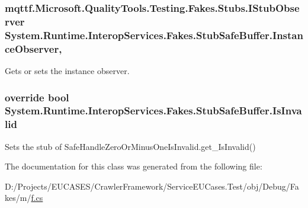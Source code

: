 \hypertarget{class_system_1_1_runtime_1_1_interop_services_1_1_fakes_1_1_stub_safe_buffer_a2b32c16b3bcfc3c0ff530913b7f87ce3}{
\subsubsection[{Instance\-Observer}]{\setlength{\rightskip}{0pt plus 5cm}mqttf.\-Microsoft.\-Quality\-Tools.\-Testing.\-Fakes.\-Stubs.\-I\-Stub\-Observer System.\-Runtime.\-Interop\-Services.\-Fakes.\-Stub\-Safe\-Buffer.\-Instance\-Observer\hspace{0.3cm}{\ttfamily [get]}, {\ttfamily [set]}}}\label{class_system_1_1_runtime_1_1_interop_services_1_1_fakes_1_1_stub_safe_buffer_a2b32c16b3bcfc3c0ff530913b7f87ce3}


Gets or sets the instance observer.

\hypertarget{class_system_1_1_runtime_1_1_interop_services_1_1_fakes_1_1_stub_safe_buffer_a4d719a99a6517b9b7baef7d8c5ab93b7}{
\subsubsection[{Is\-Invalid}]{\setlength{\rightskip}{0pt plus 5cm}override bool System.\-Runtime.\-Interop\-Services.\-Fakes.\-Stub\-Safe\-Buffer.\-Is\-Invalid\hspace{0.3cm}{\ttfamily [get]}}}\label{class_system_1_1_runtime_1_1_interop_services_1_1_fakes_1_1_stub_safe_buffer_a4d719a99a6517b9b7baef7d8c5ab93b7}


Sets the stub of Safe\-Handle\-Zero\-Or\-Minus\-One\-Is\-Invalid.\-get\-\_\-\-Is\-Invalid()



The documentation for this class was generated from the following file\-:\begin{DoxyCompactItemize}
\item 
D\-:/\-Projects/\-E\-U\-C\-A\-S\-E\-S/\-Crawler\-Framework/\-Service\-E\-U\-Cases.\-Test/obj/\-Debug/\-Fakes/m/\hyperlink{m_2f_8cs}{f.\-cs}\end{DoxyCompactItemize}
